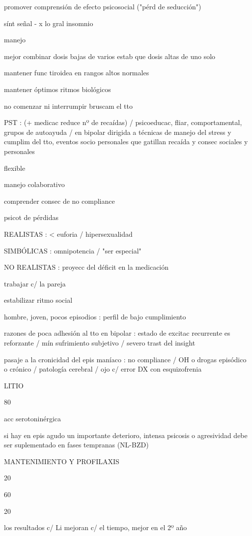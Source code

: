 promover comprensión de efecto psicosocial ("pérd de seducción")

sínt señal - x lo gral insomnio

manejo

mejor combinar dosis bajas de varios estab que dosis altas de uno solo

mantener func tiroidea en rangos altos normales

mantener óptimos ritmos biológicos

no comenzar ni interrumpir bruscam el tto

PST : (+ medicac reduce nº de recaídas) / psicoeducac, fliar, comportamental, grupos de autoayuda / en bipolar dirigida a técnicas de manejo del stress y cumplim del tto, eventos socio personales que gatillan recaída y consec sociales y personales

flexible

manejo colaborativo

comprender consec de no compliance

psicot de pérdidas

REALISTAS : < euforia / hipersexualidad

SIMBÓLICAS : omnipotencia / "ser especial"

NO REALISTAS : proyecc del déficit en la medicación

trabajar c/ la pareja

estabilizar ritmo social

hombre, joven, pocos episodios : perfil de bajo cumplimiento

razones de poca adhesión al tto en bipolar : estado de excitac recurrente es reforzante / mín sufrimiento subjetivo / severo trast del insight

pasaje a la cronicidad del epis maníaco : no compliance / OH o drogas episódico o crónico / patología cerebral / ojo c/ error DX con esquizofrenia

LITIO

80%

acc serotoninérgica

si hay en epis agudo un importante deterioro, intensa psicosis o agresividad debe ser suplementado en fases tempranas (NL-BZD)

MANTENIMIENTO Y PROFILAXIS

20 %

60 %

20 %

los resultados c/ Li mejoran c/ el tiempo, mejor en el 2º año


